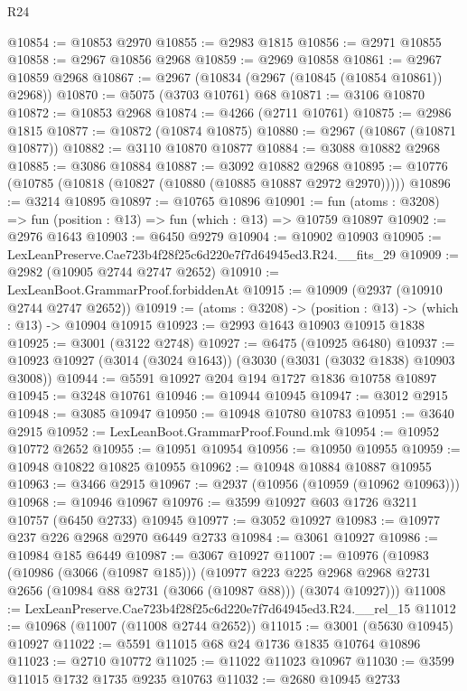 \begin{lexlean}{R24}
\begin{coremodule}
@10854 := @10853 @2970
@10855 := @2983 @1815
@10856 := @2971 @10855
@10858 := @2967 @10856 @2968
@10859 := @2969 @10858
@10861 := @2967 @10859 @2968
@10867 := @2967 (@10834 (@2967 (@10845 (@10854 @10861)) @2968))
@10870 := @5075 (@3703 @10761) @68
@10871 := @3106 @10870
@10872 := @10853 @2968
@10874 := @4266 (@2711 @10761)
@10875 := @2986 @1815
@10877 := @10872 (@10874 @10875)
@10880 := @2967 (@10867 (@10871 @10877))
@10882 := @3110 @10870 @10877
@10884 := @3088 @10882 @2968
@10885 := @3086 @10884
@10887 := @3092 @10882 @2968
@10895 := @10776 (@10785 (@10818 (@10827 (@10880 (@10885 @10887 @2972 @2970)))))
@10896 := @3214 @10895
@10897 := @10765 @10896
@10901 := fun (atoms : @3208) => fun (position : @13) => fun (which : @13) => @10759 @10897
@10902 := @2976 @1643
@10903 := @6450 @9279
@10904 := @10902 @10903
@10905 := LexLeanPreserve.Cae723b4f28f25c6d220e7f7d64945ed3.R24.__fits_29
@10909 := @2982 (@10905 @2744 @2747 @2652)
@10910 := LexLeanBoot.GrammarProof.forbiddenAt
@10915 := @10909 (@2937 (@10910 @2744 @2747 @2652))
@10919 := (atoms : @3208) -> (position : @13) -> (which : @13) -> @10904 @10915
@10923 := @2993 @1643 @10903 @10915 @1838
@10925 := @3001 (@3122 @2748)
@10927 := @6475 (@10925 @6480)
@10937 := @10923 @10927 (@3014 (@3024 @1643)) (@3030 (@3031 (@3032 @1838) @10903 @3008))
@10944 := @5591 @10927 @204 @194 @1727 @1836 @10758 @10897
@10945 := @3248 @10761
@10946 := @10944 @10945
@10947 := @3012 @2915
@10948 := @3085 @10947
@10950 := @10948 @10780 @10783
@10951 := @3640 @2915
@10952 := LexLeanBoot.GrammarProof.Found.mk
@10954 := @10952 @10772 @2652
@10955 := @10951 @10954
@10956 := @10950 @10955
@10959 := @10948 @10822 @10825 @10955
@10962 := @10948 @10884 @10887 @10955
@10963 := @3466 @2915
@10967 := @2937 (@10956 (@10959 (@10962 @10963)))
@10968 := @10946 @10967
@10976 := @3599 @10927 @603 @1726 @3211 @10757 (@6450 @2733) @10945
@10977 := @3052 @10927
@10983 := @10977 @237 @226 @2968 @2970 @6449 @2733
@10984 := @3061 @10927
@10986 := @10984 @185 @6449
@10987 := @3067 @10927
@11007 := @10976
    (@10983
      (@10986 (@3066 (@10987 @185)))
      (@10977
        @223
        @225
        @2968
        @2968
        @2731
        @2656
        (@10984 @88 @2731 (@3066 (@10987 @88)))
        (@3074 @10927)))
@11008 := LexLeanPreserve.Cae723b4f28f25c6d220e7f7d64945ed3.R24.__rel_15
@11012 := @10968 (@11007 (@11008 @2744 @2652))
@11015 := @3001 (@5630 @10945) @10927
@11022 := @5591 @11015 @68 @24 @1736 @1835 @10764 @10896
@11023 := @2710 @10772
@11025 := @11022 @11023 @10967
@11030 := @3599 @11015 @1732 @1735 @9235 @10763
@11032 := @2680 @10945 @2733

\end{coremodule}
\end{lexlean}
